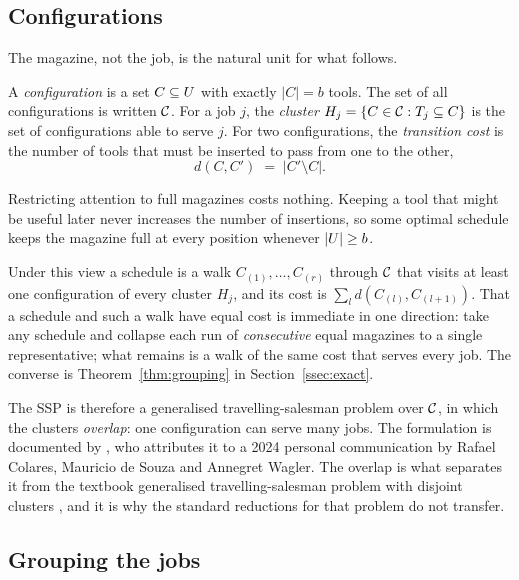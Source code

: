 \subsection{Configurations}\label{ssec:gtsp}

The magazine, not the job, is the natural unit for what follows.

\begin{definition}\label{def:config}
A \emph{configuration} is a set $C\subseteq U$ with exactly $\lvert C\rvert=b$
tools. The set of all configurations is written $\mathcal{C}$. For a job $j$, the
\emph{cluster} $H_j=\{C\in\mathcal{C} : T_j\subseteq C\}$ is the set of
configurations able to serve $j$. For two configurations, the \emph{transition
cost} is the number of tools that must be inserted to pass from one to the other,
\[
  d(C,C') \;=\; \lvert C'\setminus C\rvert .
\]
\end{definition}

Restricting attention to full magazines costs nothing. Keeping a tool that might be
useful later never increases the number of insertions, so some optimal schedule
keeps the magazine full at every position whenever $\lvert U\rvert\ge b$.

Under this view a schedule is a walk $C_{(1)},\dots,C_{(r)}$ through $\mathcal{C}$ that
visits at least one configuration of every cluster $H_j$, and its cost is
$\sum_l d(C_{(l)},C_{(l+1)})$. That a schedule and such a walk have equal cost is
immediate in one direction: take any schedule and collapse each run of \emph{consecutive}
equal magazines to a single representative; what remains is a walk of the same cost that
serves every job. The
converse is Theorem~\ref{thm:grouping} in Section~\ref{ssec:exact}.

The SSP is therefore a generalised travelling-salesman problem over $\mathcal{C}$, in
which the clusters \emph{overlap}: one configuration can serve many jobs. The
formulation is documented by \citet{Moreira2026}, who attributes it to a 2024 personal
communication by Rafael Colares, Mauricio de Souza and Annegret Wagler. The overlap is what separates it
from the textbook generalised travelling-salesman problem with disjoint clusters
\citep{Noon1993,Fischetti1997,Pop2024}, and it is why the standard reductions for
that problem do not transfer.

\subsection{Grouping the jobs}\label{ssec:jgp}

